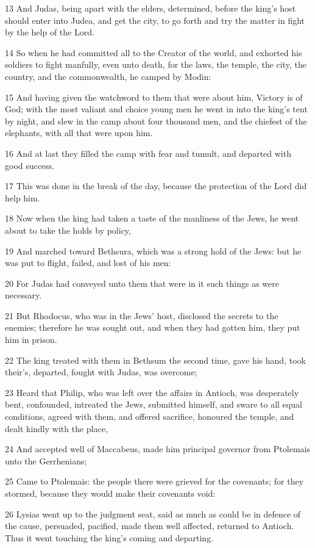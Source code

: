 \par 13 And Judas, being apart with the elders, determined, before the king's host should enter into Judea, and get the city, to go forth and try the matter in fight by the help of the Lord.
\par 14 So when he had committed all to the Creator of the world, and exhorted his soldiers to fight manfully, even unto death, for the laws, the temple, the city, the country, and the commonwealth, he camped by Modin:
\par 15 And having given the watchword to them that were about him, Victory is of God; with the most valiant and choice young men he went in into the king's tent by night, and slew in the camp about four thousand men, and the chiefest of the elephants, with all that were upon him.
\par 16 And at last they filled the camp with fear and tumult, and departed with good success.
\par 17 This was done in the break of the day, because the protection of the Lord did help him.
\par 18 Now when the king had taken a taste of the manliness of the Jews, he went about to take the holds by policy,
\par 19 And marched toward Bethsura, which was a strong hold of the Jews: but he was put to flight, failed, and lost of his men:
\par 20 For Judas had conveyed unto them that were in it such things as were necessary.
\par 21 But Rhodocus, who was in the Jews' host, disclosed the secrets to the enemies; therefore he was sought out, and when they had gotten him, they put him in prison.
\par 22 The king treated with them in Bethsum the second time, gave his hand, took their's, departed, fought with Judas, was overcome;
\par 23 Heard that Philip, who was left over the affairs in Antioch, was desperately bent, confounded, intreated the Jews, submitted himself, and sware to all equal conditions, agreed with them, and offered sacrifice, honoured the temple, and dealt kindly with the place,
\par 24 And accepted well of Maccabeus, made him principal governor from Ptolemais unto the Gerrhenians;
\par 25 Came to Ptolemais: the people there were grieved for the covenants; for they stormed, because they would make their covenants void:
\par 26 Lysias went up to the judgment seat, said as much as could be in defence of the cause, persuaded, pacified, made them well affected, returned to Antioch. Thus it went touching the king's coming and departing.


